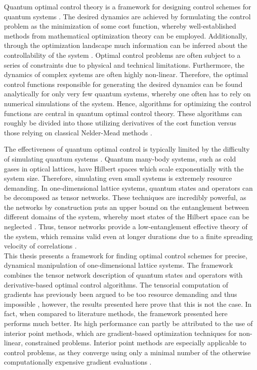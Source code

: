 Quantum optimal control theory is a framework for designing control schemes for quantum systems \cite{Peirce1988,Werschnik2007}. The desired dynamics are achieved by formulating the control problem as the minimization of some cost function, whereby well-established methods from mathematical optimization theory can be employed. Additionally, through the optimization landscape much information can be inferred about the controllability of the system \cite{Rabitz2004}. Optimal control problems are often subject to a series of constraints due to physical and technical limitations. Furthermore, the dynamics of complex systems are often highly non-linear. Therefore, the optimal control functions responsible for generating the desired dynamics can be found analytically for only very few quantum systems, whereby one often has to rely on numerical simulations of the system. Hence, algorithms for optimizing the control functions are central in quantum optimal control theory. These algorithms can roughly be divided into those utilizing derivatives of the cost function \cite{Khaneja2005,Krotov1995} versus those relying on classical Nelder-Mead methods \cite{Doria2011}.

The effectiveness of quantum optimal control is typically limited by the difficulty of simulating quantum systems \cite{Vidal2003}. Quantum many-body systems, such as cold gases in optical lattices, have Hilbert spaces which scale exponentially with the system size. Therefore, simulating even small systems is extremely resource demanding. In one-dimensional lattice systems, quantum states and operators can be decomposed as tensor networks. These techniques are incredibly powerful, as the networks by construction puts an upper bound on the entanglement between different domains of the system, whereby most states of the Hilbert space can be neglected \cite{schollwock,Cramer}. Thus, tensor networks provide a low-entanglement effective theory of the system, which remains valid even at longer durations due to a finite spreading velocity of correlations \cite{Bravyi2006,Eisert2006}.\\

This thesis presents a framework for finding optimal control schemes for precise, dynamical manipulation of one-dimensional lattice systems. The framework combines the tensor network description of quantum states and operators with derivative-based optimal control algorithms. The tensorial computation of gradients has previously been argued to be too resource demanding and thus impossible \cite{Doria2011}, however, the results presented here prove that this is not the case. In fact, when compared to literature methods, the framework presented here performs much better. Its high performance can partly be attributed to the use of interior point methods, which are gradient-based optimization techniques for non-linear, constrained problems. Interior point methods are especially applicable to control problems, as they converge using only a minimal number of the otherwise computationally expensive gradient evaluations \cite{wright}.

